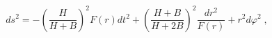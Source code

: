 \begin{equation}
ds^{2}=-\left( \frac{H}{H+B}\right) ^{2}F(r)dt^{2}+\left( \frac{H+B}{H+2B}%
\right) ^{2}\frac{dr^{2}}{F(r)}+r^{2}d\varphi ^{2}\;,  \label{The metric}
\end{equation}

